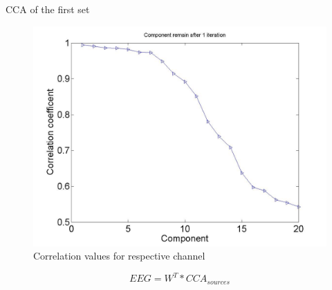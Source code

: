 \documentclass[t,12pt,english
\ifx\beamermode\undefined\else,\beamermode\fi
]{beamer}
\begin{document}
\begin{frame}{CCA of the first set}
\begin{figure}[!htbp]
\includegraphics[width=1\textwidth]{5.jpg}\\
\tiny{\tiny Correlation values for respective channel}
\endminipage\hfill
\end{figure}

\begin{equation}
    EEG=W^{T}*CCA_{sources}
\end{equation}
 
\end{frame} 
      
\end{document}
